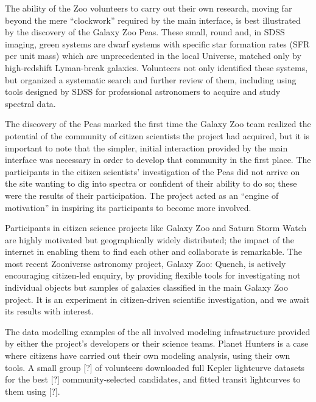 \documentclass{ar2e}
\begin{document}
The ability of the Zoo volunteers to carry out their own research, moving far
beyond the mere ``clockwork'' required by the main interface, is best
illustrated by the discovery of the Galaxy Zoo Peas. These small, round and, in
SDSS imaging, green systems are dwarf systems with specific star formation rates
(SFR per unit mass) which are unprecedented in the local Universe, matched only
by high-redshift Lyman-break galaxies. Volunteers not only identified these
systems, but organized a systematic search and further review of them, including
using tools designed by SDSS for professional astronomers to acquire and study
spectral data. 

The discovery of the Peas marked the first time the Galaxy Zoo team realized the
potential of the community of citizen scientists the project had acquired, but
it is important to note that the simpler, initial interaction provided by the
main interface was necessary in order to develop that community in the first
place. The participants in the citizen scientists' investigation of the Peas did
not arrive on the site wanting to dig into spectra or confident of their ability
to do so; these were the results of their participation. The project  acted as
an ``engine of motivation'' in inspiring its participants to become more
involved. 


Participants in citizen science projects like Galaxy Zoo and Saturn Storm Watch 
are highly motivated but geographically widely distributed; the impact of the
internet in enabling them to find each other and collaborate is remarkable. The
most recent Zooniverse astronomy project, Galaxy Zoo: Quench, is actively
encouraging citizen-led enquiry, by providing flexible tools for investigating
not individual objects but samples of galaxies classified in the main Galaxy Zoo
project. It is an experiment in citizen-driven scientific investigation, and we
await its results with interest.



  The data modelling
examples of the  all involved modeling infrastructure provided
by either the project's developers or their science teams. Planet Hunters is a
case where citizens have carried out their own modeling analysis, using their
own tools. A small group [?] of volunteers downloaded full Kepler lightcurve
datasets for the best [?] community-selected candidates, and fitted transit
lightcurves to them using [?]. 
\end{document}
